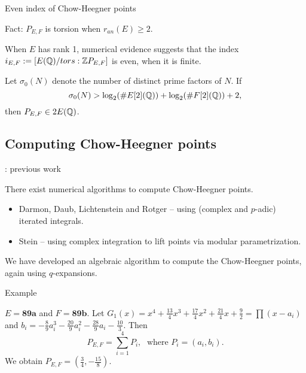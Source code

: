 \documentclass[handout]{beamer}
\begin{document}
\begin{frame}{Even index of Chow-Heegner points}

Fact: $P_{E,F}$ is torsion when $r_{an}(E) \geq 2$. 


When $E$ has rank 1, numerical evidence suggests that the index $i_{E,F} := [E(\mathbb{Q})/tors: \mathbb{Z} P_{E,F}]$ is even, 
when it is finite. 
\begin{theorem}[C.]
Let $\sigma_0(N)$ denote the number of distinct prime factors of $N$. If 
\[
	\sigma_0(N) > \log_2(\# E[2](\mathbb{Q})) + \log_2(\# F[2](\mathbb{Q})) + 2,
\]
then $P_{E,F} \in 2E(\mathbb{Q})$. 
\end{theorem}
\end{frame}

\subsection{Computing Chow-Heegner points}

\begin{frame}{\insertsubsection : previous work}


There exist numerical algorithms to compute Chow-Heegner points.  

\medskip 

\begin{itemize}
\item Darmon, Daub, Lichtenstein and Rotger -- using (complex and $p$-adic) iterated integrals. 
\item Stein  -- using complex integration to lift points via modular parametrization. 
\end{itemize}

We have developed an algebraic algorithm to compute the Chow-Heegner points,  again using $q$-expansions.

\end{frame}


\begin{frame}{Example}

\begin{Example}
$E = \textbf{89a}$ and $F = \textbf{89b}$. Let
$G_1(x) = x^{4} + \frac{13}{4} x^{3} + \frac{17}{4} x^{2} + \frac{21}{4} x + \frac{9}{2}=  \prod (x-a_i)$ and $b_i = -\frac{8}{9} a_i^{3} - \frac{20}{9} a_i^{2} - \frac{28}{9} a_i - \frac{10}{3}$. Then 
	$$P_{E,F} = \sum_{i=1}^4 P_i, \; \mbox{ where } P_i = (a_i, b_i).$$
We obtain $P_{E,F} = (\frac{3}{4},-\frac{15}{8})$. 
\end{Example}


\end{frame}
\end{document}

